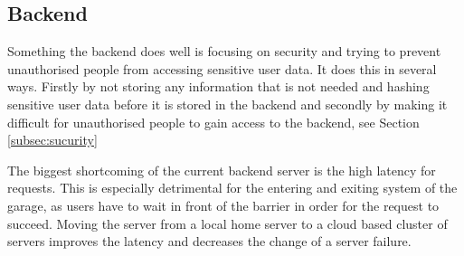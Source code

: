 \subsection{Backend}
Something the backend does well is focusing on security and trying to prevent unauthorised people from accessing sensitive user data. It does this in several ways. Firstly by not storing any information that is not needed and hashing sensitive user data before it is stored in the backend and secondly by making it difficult for unauthorised people to gain access to the backend, see Section \ref{subsec:sucurity}

\ind The biggest shortcoming of the current backend server is the high latency for requests. This is especially detrimental for the entering and exiting system of the garage, as users have to wait in front of the barrier in order for the request to succeed. Moving the server from a local home server to a cloud based cluster of servers improves the latency and decreases the change of a server failure.











